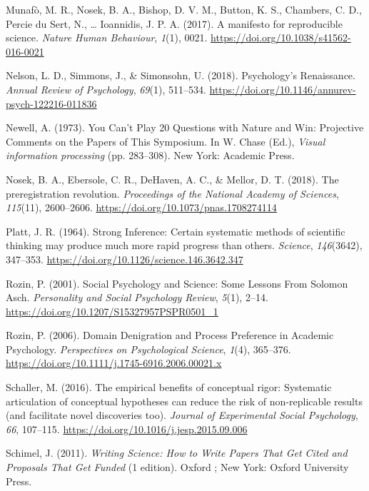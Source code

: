 \documentclass[11pt,man]{article}
\begin{document}
\hypertarget{ref-munafo_manifesto_2017}{}
Munafò, M. R., Nosek, B. A., Bishop, D. V. M., Button, K. S., Chambers,
C. D., Percie du Sert, N., \ldots{} Ioannidis, J. P. A. (2017). A
manifesto for reproducible science. \emph{Nature Human Behaviour},
\emph{1}(1), 0021. \url{https://doi.org/10.1038/s41562-016-0021}

\hypertarget{ref-nelson_psychologys_2018}{}
Nelson, L. D., Simmons, J., \& Simonsohn, U. (2018). Psychology's
Renaissance. \emph{Annual Review of Psychology}, \emph{69}(1), 511--534.
\url{https://doi.org/10.1146/annurev-psych-122216-011836}

\hypertarget{ref-newell_you_1973}{}
Newell, A. (1973). You Can't Play 20 Questions with Nature and Win:
Projective Comments on the Papers of This Symposium. In W. Chase (Ed.),
\emph{Visual information processing} (pp. 283--308). New York: Academic
Press.

\hypertarget{ref-nosek_preregistration_2018}{}
Nosek, B. A., Ebersole, C. R., DeHaven, A. C., \& Mellor, D. T. (2018).
The preregistration revolution. \emph{Proceedings of the National
Academy of Sciences}, \emph{115}(11), 2600--2606.
\url{https://doi.org/10.1073/pnas.1708274114}

\hypertarget{ref-platt_strong_1964}{}
Platt, J. R. (1964). Strong Inference: Certain systematic methods of
scientific thinking may produce much more rapid progress than others.
\emph{Science}, \emph{146}(3642), 347--353.
\url{https://doi.org/10.1126/science.146.3642.347}

\hypertarget{ref-rozin_social_2001}{}
Rozin, P. (2001). Social Psychology and Science: Some Lessons From
Solomon Asch. \emph{Personality and Social Psychology Review},
\emph{5}(1), 2--14. \url{https://doi.org/10.1207/S15327957PSPR0501_1}

\hypertarget{ref-rozin_domain_2006}{}
Rozin, P. (2006). Domain Denigration and Process Preference in Academic
Psychology. \emph{Perspectives on Psychological Science}, \emph{1}(4),
365--376. \url{https://doi.org/10.1111/j.1745-6916.2006.00021.x}

\hypertarget{ref-schaller_empirical_2016}{}
Schaller, M. (2016). The empirical benefits of conceptual rigor:
Systematic articulation of conceptual hypotheses can reduce the risk of
non-replicable results (and facilitate novel discoveries too).
\emph{Journal of Experimental Social Psychology}, \emph{66}, 107--115.
\url{https://doi.org/10.1016/j.jesp.2015.09.006}

\hypertarget{ref-schimel_writing_2011}{}
Schimel, J. (2011). \emph{Writing Science: How to Write Papers That Get
Cited and Proposals That Get Funded} (1 edition). Oxford ; New York:
Oxford University Press.
\end{document}
